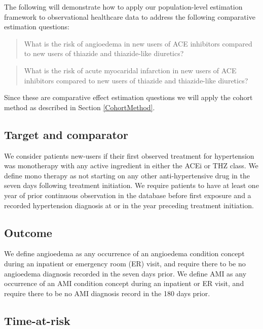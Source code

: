 \documentclass[11pt]{book}
\theoremstyle{definition}
\theoremstyle{definition}
\theoremstyle{definition}
\theoremstyle{remark}
\begin{document}
The following will demonstrate how to apply our population-level estimation framework to observational healthcare data to address the following comparative estimation questions:

\begin{quote}
What is the risk of angioedema in new users of ACE inhibitors compared to new users of thiazide and thiazide-like diuretics?
\end{quote}

\begin{quote}
What is the risk of acute myocaridal infarction in new users of ACE inhibitors compared to new users of thiazide and thiazide-like diuretics?
\end{quote}

Since these are comparative effect estimation questions we will apply the cohort method as described in Section \ref{CohortMethod}.

\hypertarget{target-and-comparator}{%
\subsection{Target and comparator}\label{target-and-comparator}}

We consider patients new-users if their first observed treatment for hypertension was monotherapy with any active ingredient in either the ACEi or THZ class. We define mono therapy as not starting on any other anti-hypertensive drug in the seven days following treatment initiation. We require patients to have at least one year of prior continuous observation in the database before first exposure and a recorded hypertension diagnosis at or in the year preceding treatment initiation.

\hypertarget{outcome-1}{%
\subsection{Outcome}\label{outcome-1}}

We define angioedema as any occurrence of an angioedema condition concept during an inpatient or emergency room (ER) visit, and require there to be no angioedema diagnosis recorded in the seven days prior. We define AMI as any occurrence of an AMI condition concept during an inpatient or ER visit, and require there to be no AMI diagnosis record in the 180 days prior.

\hypertarget{time-at-risk-1}{%
\subsection{Time-at-risk}\label{time-at-risk-1}}
\end{document}
